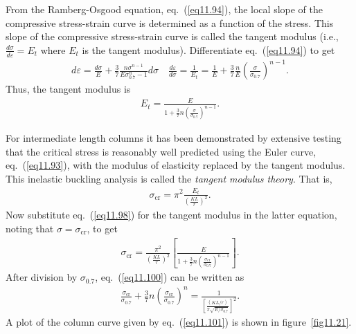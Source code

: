 \documentclass{AeroStructure-ERJohnson}
\begin{document}
From the Ramberg-Osgood equation, eq.~(\ref{eq11.94}), the local slope of the compressive stress-strain curve is determined as a function of the stress. This slope of the compressive stress-strain curve is called the tangent modulus (i.e., $\frac{d \sigma}{d \varepsilon}=E_{t}$ where $E_t$ is the tangent modulus). Differentiate eq.~(\ref{eq11.94}) to\vspace*{-3pt} get
\begin{align}\label{eq11.97}
d \varepsilon=\frac{d \sigma}{E}+\frac{3}{7} \frac{n \sigma^{n-1}}{E \sigma_{0.7}^{n}-1} d \sigma \quad \frac{d \varepsilon}{d \sigma}=\frac{1}{E_{t}}=\frac{1}{E}+\frac{3}{7} \frac{n}{E}\left(\frac{\sigma}{\sigma_{0.7}}\right)^{n-1}.
\end{align}
Thus, the tangent modulus\vspace*{-3pt} is
\begin{align}\label{eq11.98}
E_{t}=\frac{E}{1+\frac{3}{7} n\left(\frac{\sigma}{\sigma_{0.7}}\right)^{n-1}}.
\end{align}

\removelastskip

For intermediate length columns it has been demonstrated by extensive testing that the critical stress is reasonably well predicted using the Euler curve, eq.~(\ref{eq11.93}), with the modulus of elasticity replaced by the tangent modulus. This inelastic buckling analysis is called the \textit{tangent modulus theory}. That is\vspace*{-3pt},
\begin{align}\label{eq11.99}
\sigma_{\textrm{cr}}=\pi^{2} \frac{E_{t}}{\left(\frac{K L}{r}\right)^{2}}.
\end{align}
Now substitute eq.~(\ref{eq11.98}) for the tangent modulus in the latter equation, noting that $\sigma=\sigma_{\textrm{cr}}$, to\vspace*{-3pt} get
\begin{align}\label{eq11.100}
\sigma_{\textrm{cr}}=\frac{\pi^{2}}{\left(\frac{K L}{r}\right)^{2}}\left[\frac{E}{1+\frac{3}{7} n\left(\frac{\sigma_{\textrm{cr}}}{\sigma_{0.7}}\right)^{n-1}}\right].
\end{align}
After division by $\sigma_{0.7}$, eq.~(\ref{eq11.100}) can be written as
\begin{align}\label{eq11.101}
\frac{\sigma_{\textrm{cr}}}{\sigma_{0.7}}+\frac{3}{7} n\left(\frac{\sigma_{\textrm{cr}}}{\sigma_{0.7}}\right)^{n}=\frac{1}{\left[\frac{(K L/r)}{\pi \sqrt{E/ \sigma_{0.7}}}\right]^{2}}.
\end{align}
A plot of the column curve given by eq.~(\ref{eq11.101}) is shown in figure~\ref{fig11.21}.
\end{document}
